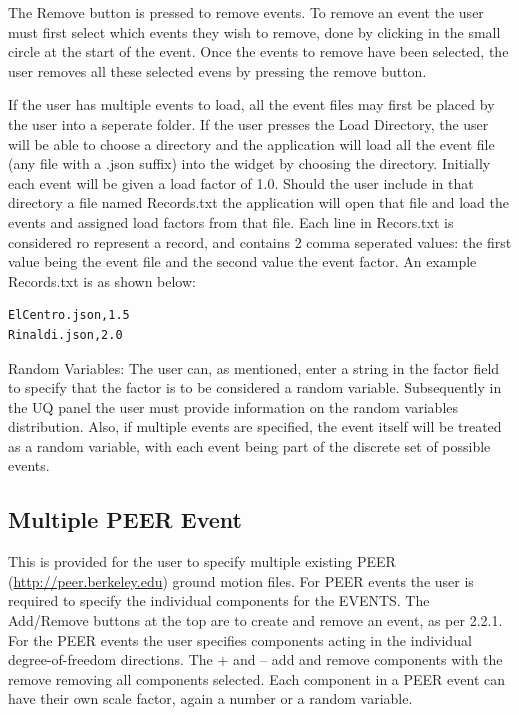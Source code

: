 The Remove button is pressed to remove events. To remove an event the user must first select
which events they wish to remove, done by clicking in the small circle at the start of the event. Once the events to remove  have been selected, the user removes all these selected evens by pressing the remove button.

If the user has multiple events to load, all the event files may first be placed by the user into a seperate folder. If the user presses the  Load Directory, the user will be able to choose a directory and the application will load all the event file (any file with a .json suffix) into the widget by choosing the directory. Initially each event will be given a load factor of 1.0.  Should the user include in that directory a file named Records.txt the application will open that file and load the events and assigned load factors from that file. Each line in Recors.txt is considered ro represent a record, and contains 2 comma seperated values: the first value being the event file and the second value the event factor. An example Records.txt is as shown below:

\begin{verbatim}
ElCentro.json,1.5
Rinaldi.json,2.0
\end{verbatim}

Random Variables: The user can, as mentioned, enter a string in the factor field to specify that the factor is to be considered a random variable. Subsequently in the UQ panel the user must provide information on the random variables distribution. Also, if multiple events are specified, the event itself will be treated as a random variable, with each event being part of the discrete set of possible events.

\subsection{Multiple PEER Event}
This is provided for the user to specify multiple existing PEER 
(\href{http://peer.berkeley.edu}{http://peer.berkeley.edu}) ground motion files. 
For PEER events the user is required to specify the individual components for the EVENTS. 
The Add/Remove buttons at the top are to create and remove an event, as per 2.2.1. 
For the PEER events the user specifies components acting in the individual degree-of-freedom directions. 
The + and – add and remove components with the remove removing all components selected. 
Each component in a PEER event can have their own scale factor, again a number or a random variable.

